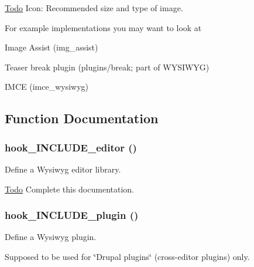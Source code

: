 \begin{Desc}
\item[\hyperlink{todo__todo000063}{Todo}]Icon: Recommended size and type of image.\end{Desc}
For example implementations you may want to look at
\begin{DoxyItemize}
\item Image Assist (img\_\-assist)
\item Teaser break plugin (plugins/break; part of WYSIWYG)
\item IMCE (imce\_\-wysiwyg) 
\end{DoxyItemize}

\subsection{Function Documentation}
\hypertarget{wysiwyg_8api_8php_ad3605f8cb948779e59e72c711a7ff843}{
\subsubsection[{hook\_\-INCLUDE\_\-editor}]{\setlength{\rightskip}{0pt plus 5cm}hook\_\-INCLUDE\_\-editor ()}}
\label{wysiwyg_8api_8php_ad3605f8cb948779e59e72c711a7ff843}
Define a Wysiwyg editor library.

\begin{Desc}
\item[\hyperlink{todo__todo000064}{Todo}]Complete this documentation. \end{Desc}
\hypertarget{wysiwyg_8api_8php_a20be879b59430637a6832dbbc221eb7c}{
\subsubsection[{hook\_\-INCLUDE\_\-plugin}]{\setlength{\rightskip}{0pt plus 5cm}hook\_\-INCLUDE\_\-plugin ()}}
\label{wysiwyg_8api_8php_a20be879b59430637a6832dbbc221eb7c}
Define a Wysiwyg plugin.

Supposed to be used for \char`\"{}Drupal plugins\char`\"{} (cross-\/editor plugins) only.

